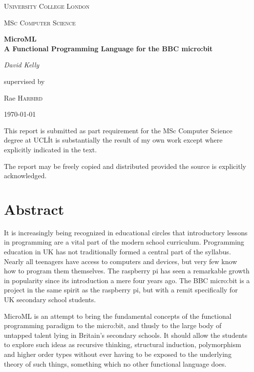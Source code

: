 \documentclass[12pt, a4paper]{report}
\begin{document}
\begin{titlepage}
    \centering
    {\scshape\LARGE University College London\par}
    \vspace{1cm}
    {\scshape\Large MSc Computer Science\par}
    \vspace{1.5cm}
    {\huge\bfseries MicroML \\ A Functional Programming Language for the BBC micro:bit \par}
    \vspace{2cm}
    {\huge\itshape David Kelly\par}
    \vfill
    supervised by\par
    {\large Rae \textsc{Harbird}}

    \vfill
    {\large \today\par}

    \vfill

    This report is submitted as part requirement for the MSc Computer Science
    degree at UCL\. It is substantially the result of my own work except where 
    explicitly indicated in the text.
    
    \vfill

    The report may be freely copied and distributed provided the source is explicitly
    acknowledged.
\end{titlepage}

{\pagestyle{plain}
\tableofcontents
\cleardoublepage}

\chapter*{Abstract}
It is increasingly being recognized in educational circles that introductory lessons in programming
are a vital part of the modern school curriculum. Programming education in UK has not traditionally
formed a central part of the syllabus. Nearly all teenagers have access to computers and devices, but very
few know how to program them themselves. The raspberry pi has seen a remarkable growth in
popularity since its introduction a mere four years ago. The BBC micro:bit is a project in the
same spirit as the raspberry pi, but with a remit specifically for UK secondary school students.

MicroML is an attempt to bring the fundamental concepts of the functional programming paradigm
to the micro:bit, and thusly to the large body of untapped talent lying in Britain's secondary
schools. It should allow the students to explore such ideas as recursive thinking, structural
induction, polymorphism and higher order types without ever having to be exposed to the
underlying theory of such things, something which no other functional language does.  
\end{document}
